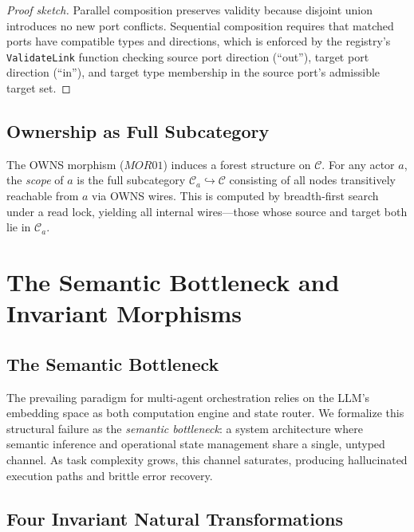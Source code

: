 \documentclass[submission,copyright,creativecommons]{eptcs}
\begin{document}
\begin{proof}[Proof sketch]
Parallel composition preserves validity because disjoint union introduces no
new port conflicts. Sequential composition requires that matched ports have
compatible types and directions, which is enforced by the registry's
\texttt{ValidateLink} function checking source port direction (``out''), target
port direction (``in''), and target type membership in the source port's
admissible target set.
\end{proof}

\subsection{Ownership as Full Subcategory}

The OWNS morphism ($\mathit{MOR01}$) induces a forest structure on
$\mathcal{C}$. For any actor $a$, the \emph{scope} of $a$ is the full
subcategory $\mathcal{C}_a \hookrightarrow \mathcal{C}$ consisting of all
nodes transitively reachable from $a$ via OWNS wires. This is computed by
breadth-first search under a read lock, yielding all internal wires---those
whose source and target both lie in $\mathcal{C}_a$.



\section{The Semantic Bottleneck and Invariant Morphisms}
\label{sec:bottleneck}

\subsection{The Semantic Bottleneck}

The prevailing paradigm for multi-agent orchestration relies on the LLM's
embedding space as both computation engine and state router. We formalize this
structural failure as the \emph{semantic bottleneck}: a system architecture
where semantic inference and operational state management share a single,
untyped channel. As task complexity grows, this channel saturates, producing
hallucinated execution paths and brittle error recovery.

\subsection{Four Invariant Natural Transformations}
\end{document}
